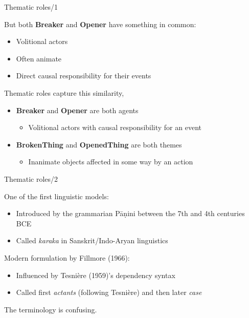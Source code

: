 \documentclass[10pt, compress]{beamer}
\begin{document}
\begin{frame}{Thematic roles/1}

But both \textbf{Breaker} and \textbf{Opener} have something in common:
\begin{itemize}
  \item Volitional actors
  \item Often animate
  \item Direct causal responsibility for their events
\end{itemize} 

Thematic roles capture this similarity,
\begin{itemize}
\item \textbf{Breaker} and \textbf{Opener} are both {\sc agents}
\begin{itemize}
  \item Volitional actors with causal responsibility for an event
\end{itemize}
\item \textbf{BrokenThing} and \textbf{OpenedThing} are both {\sc themes}
\begin{itemize}
  \item Inanimate objects affected in some way by an action
\end{itemize}
\end{itemize}

\end{frame}

\begin{frame}{Thematic roles/2}

One of the first linguistic models:
\begin{itemize}
  \item Introduced by the grammarian Pāṇini between the 7th and 4th centuries BCE
  \item Called \emph{karaka} in Sanskrit/Indo-Aryan linguistics
\end{itemize}

Modern formulation by Fillmore (1966):
\begin{itemize}
  \item Influenced by Tesnière (1959)'s dependency syntax
  \item Called first \emph{actants} (following Tesnière) and then later \emph{case}
\end{itemize}

The terminology is confusing.

\end{frame}
\end{document}
